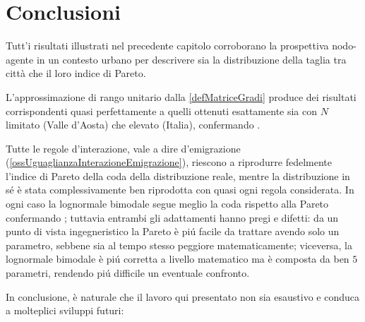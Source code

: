 

\chapter{Conclusioni}\label{secConclusioni}

  Tutt'i risultati illustrati nel precedente capitolo corroborano la prospettiva nodo-agente in un contesto urbano per descrivere sia la distribuzione della taglia tra città che il loro indice di Pareto.

  L'approssimazione di rango unitario dalla \cref{defMatriceGradi} produce dei risultati corrispondenti quasi perfettamente a quelli ottenuti esattamente sia con \(N\) limitato (Valle d'Aosta) che elevato (Italia), confermando \cite{Nurisso2024}.%

  Tutte le regole d'interazione, vale a dire d'emigrazione (\cref{ossUguaglianzaInterazioneEmigrazione}), riescono a riprodurre fedelmente l'indice di Pareto della coda della distribuzione reale, mentre la distribuzione in sé è stata complessivamente ben riprodotta con quasi ogni regola considerata. In ogni caso la lognormale bimodale segue meglio la coda rispetto alla Pareto confermando \cite{Gualandi2019SDC,Gualandi2019HBLD}; tuttavia entrambi gli adattamenti hanno pregi e difetti: da un punto di vista ingegneristico la Pareto è piú facile da trattare avendo solo un parametro, sebbene sia al tempo stesso peggiore matematicamente; viceversa, la lognormale bimodale è piú corretta a livello matematico ma è composta da ben \(5\) parametri, rendendo piú difficile un eventuale confronto.

  In conclusione, è naturale che il lavoro qui presentato non sia esaustivo e conduca a molteplici sviluppi futuri:

